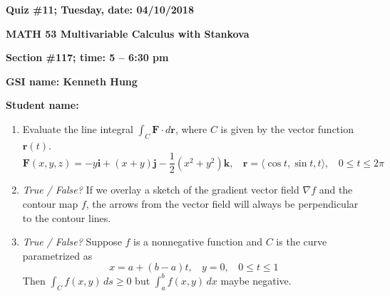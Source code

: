 \documentclass{article}
\newcommand{\ii}{\mathbf{i}}
\newcommand{\jj}{\mathbf{j}}
\newcommand{\kk}{\mathbf{k}}
\begin{document}
{\bf Quiz \#11; Tuesday, date: 04/10/2018}

{\bf MATH 53 Multivariable Calculus with Stankova}

{\bf Section \#117; time: 5 -- 6:30 pm}

{\bf GSI name: Kenneth Hung}

{\bf Student name:}

\vspace*{0.25in}

\begin{enumerate}
\item Evaluate the line integral $\int_C \mathbf{F} \cdot d\mathbf{r}$, where $C$ is given by the vector function $\mathbf{r}(t)$.
\[
\mathbf{F}(x, y, z) = -y \ii + (x + y) \jj - \frac{1}{2} (x^2 + y^2) \kk, ~~~~ \mathbf{r} = \langle \cos t, \sin t, t \rangle, ~~~~ 0 \le t \le 2\pi
\]

\item {\em True / False?} If we overlay a sketch of the gradient vector field $\nabla f$ and the contour map $f$, the arrows from the vector field will always be perpendicular to the contour lines.

\item {\em True / False?} Suppose $f$ is a nonnegative function and $C$ is the curve parametrized as
\[
x = a + (b - a)t, ~~~~ y = 0, ~~~~ 0 \le t \le 1
\]
Then $\int_C f(x, y) \,ds \ge 0$ but $\int_a^b f(x, y) \,dx$ maybe negative.
\end{enumerate}
\end{document}
